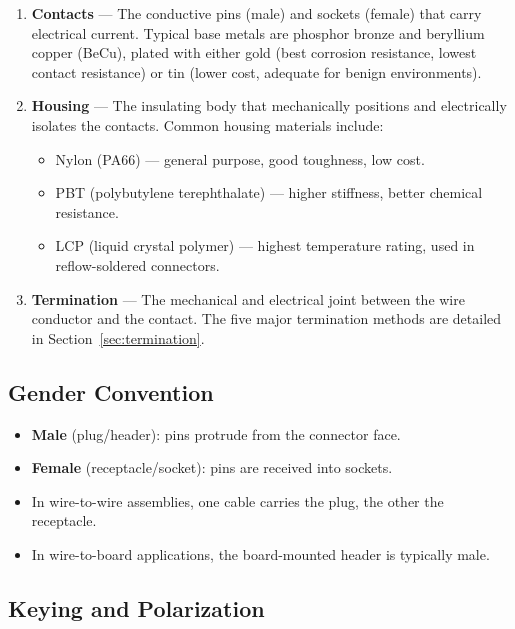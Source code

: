 \documentclass[11pt,letterpaper,twoside,openany]{book}
\begin{document}
\begin{enumerate}[leftmargin=1.5em]
  \item \textbf{Contacts} --- The conductive pins (male) and sockets (female) that carry electrical current. Typical base metals are phosphor bronze and beryllium copper (BeCu), plated with either gold (best corrosion resistance, lowest contact resistance) or tin (lower cost, adequate for benign environments).

  \item \textbf{Housing} --- The insulating body that mechanically positions and electrically isolates the contacts. Common housing materials include:
  \begin{itemize}[nosep]
    \item Nylon (PA66) --- general purpose, good toughness, low cost.
    \item PBT (polybutylene terephthalate) --- higher stiffness, better chemical resistance.
    \item LCP (liquid crystal polymer) --- highest temperature rating, used in reflow-soldered connectors.
  \end{itemize}

  \item \textbf{Termination} --- The mechanical and electrical joint between the wire conductor and the contact. The five major termination methods are detailed in Section~\ref{sec:termination}.
\end{enumerate}

\subsection{Gender Convention}

\begin{itemize}[leftmargin=1.5em]
  \item \textbf{Male} (plug/header): pins protrude from the connector face.
  \item \textbf{Female} (receptacle/socket): pins are received into sockets.
  \item In wire-to-wire assemblies, one cable carries the plug, the other the receptacle.
  \item In wire-to-board applications, the board-mounted header is typically male.
\end{itemize}

\subsection{Keying and Polarization}
\end{document}
